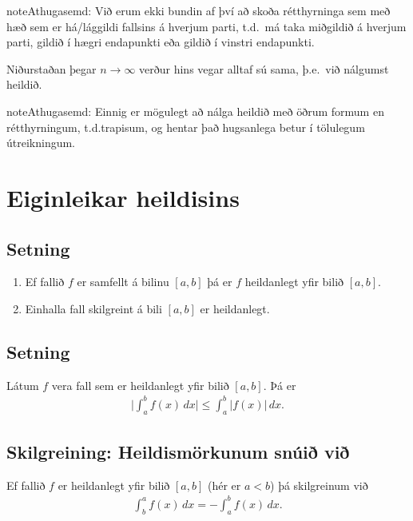 \documentclass[b5paper,10pt,icelandic]{sphinxmanual}
\begin{document}
\begin{sphinxadmonition}{note}{Athugasemd:}
Við erum ekki bundin af því að skoða rétthyrninga sem með hæð sem er
há/lággildi fallsins á hverjum parti, t.d. má taka miðgildið á hverjum
parti, gildið í hægri endapunkti eða gildið í vinstri endapunkti.

Niðurstaðan þegar \(n\to \infty\) verður hins vegar alltaf sú sama,
þ.e. við nálgumst heildið.
\end{sphinxadmonition}

\begin{sphinxadmonition}{note}{Athugasemd:}
Einnig er mögulegt að nálga heildið með öðrum formum en rétthyrningum,
t.d.trapisum, og hentar það hugsanlega betur í
tölulegum útreikningum.
\end{sphinxadmonition}


\section{Eiginleikar heildisins}
\label{\detokenize{kafli06:eiginleikar-heildisins}}

\subsection{Setning}
\label{\detokenize{kafli06:setning}}\begin{enumerate}
\item {} 
Ef fallið \(f\) er samfellt á bilinu \([a, b]\) þá er
\(f\) heildanlegt yfir bilið \([a, b]\).

\item {} 
Einhalla fall skilgreint á bili \([a,b]\) er heildanlegt.

\end{enumerate}


\subsection{Setning}
\label{\detokenize{kafli06:id2}}
Látum \(f\) vera fall sem er heildanlegt yfir bilið \([a, b]\).
Þá er
\begin{equation*}
\begin{split}\Big|\int_a^b f(x)\,dx\Big|\leq \int_a^b |f(x)|\,dx.\end{split}
\end{equation*}

\subsection{Skilgreining: Heildismörkunum snúið við}
\label{\detokenize{kafli06:skilgreining-heildismorkunum-snui-vi}}
Ef fallið \(f\) er heildanlegt yfir bilið \([a,b]\) (hér er
\(a<b\)) þá skilgreinum við
\begin{equation*}
\begin{split}\int_b^a f(x)\,dx=-\int_a^b f(x)\,dx.\end{split}
\end{equation*}
\end{document}
